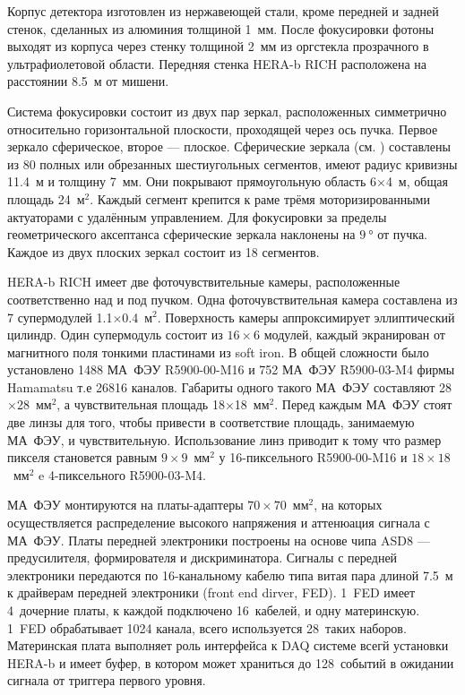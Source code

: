 
Корпус детектора изготовлен из нержавеющей стали, кроме передней и задней стенок, сделанных из алюминия толщиной 1~мм. После фокусировки фотоны выходят из корпуса через стенку толщиной 2~мм из оргстекла прозрачного в ультрафиолетовой области. Передняя стенка HERA-b RICH расположена на расстоянии 8.5~м от мишени.

Система фокусировки состоит из двух пар зеркал, расположенных симметрично относительно горизонтальной плоскости, проходящей через ось пучка. Первое зеркало сферическое, второе --- плоское. Сферические зеркала (см. ) составлены из 80 полных или обрезанных шестиугольных сегментов, имеют радиус кривизны 11.4~м и толщину 7~мм. Они покрывают прямоугольную область 6$\times$4~м, общая площадь 24~м$^2$. Каждый сегмент крепится к раме трёмя моторизированными актуаторами с удалённым управлением. Для фокусировки за пределы геометрического аксептанса сферические зеркала наклонены на $\SI{9}{\degree}$ от пучка. Каждое из двух плоских зеркал состоит из 18 сегментов.



HERA-b RICH имеет две фоточувствительные камеры, расположенные соответственно над и под пучком. Одна фоточувствительная камера составлена из 7 супермодулей 1.1$\times$0.4~м$^2$. Поверхность камеры аппроксимирует эллиптический цилиндр. Один супермодуль состоит из $16 \times 6$ модулей, каждый экранирован от магнитного поля тонкими пластинами из soft iron. В общей сложности было установлено 1488 МА~ФЭУ R5900-00-M16 и 752 МА~ФЭУ R5900-03-M4 фирмы Hamamatsu т.е 26816 каналов. Габариты одного такого МА~ФЭУ составляют 28$\times$28~мм$^2$, а чувствительная площадь 18$\times$18~мм$^2$. Перед каждым МА~ФЭУ стоят две линзы для того, чтобы привести в соответствие площадь, занимаемую МА~ФЭУ, и чувствительную. Использование линз приводит к тому что размер пикселя становется равным $9 \times 9$~мм$^2$ у 16-пиксельного R5900-00-M16 и $18 \times 18$~мм$^2$ e 4-пиксельного R5900-03-M4.

МА~ФЭУ монтируются на платы-адаптеры $70 \times 70$~мм$^2$, на которых осуществляется распределение высокого напряжения и аттенюация сигнала с МА~ФЭУ. Платы передней электроники построены на основе чипа ASD8 --- предусилителя, формирователя и дискриминатора. Сигналы с передней электроники передаются по 16-канальному кабелю типа витая пара длиной 7.5~м к драйверам передней электроники (front end dirver, FED). 1~FED имеет 4~дочерние платы, к каждой подключено 16~кабелей, и одну материнскую. 1~FED обрабатывает 1024 канала, всего используется 28~таких наборов. Материнская плата выполняет роль интерфейса к DAQ системе всегй установки HERA-b и имеет буфер, в котором может храниться до 128~событий в ожидании сигнала от триггера первого уровня.

